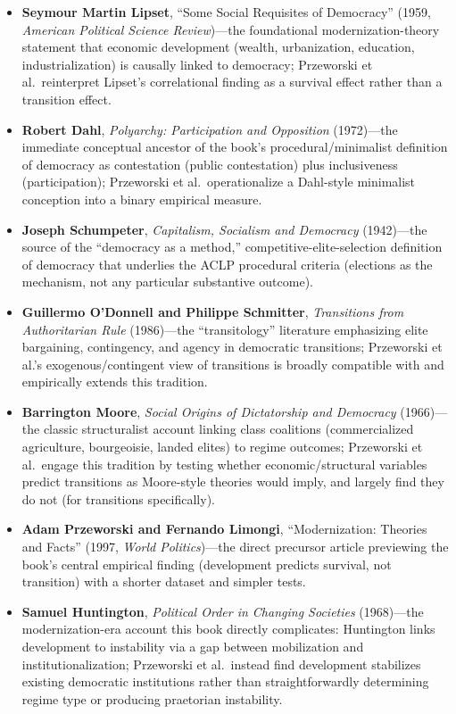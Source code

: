 \documentclass[12pt]{article}
\begin{document}
\begin{itemize}[leftmargin=*, itemsep=4pt]
    \item \textbf{Seymour Martin Lipset}, ``Some Social Requisites of Democracy'' (1959, \textit{American Political Science Review})---the foundational modernization-theory statement that economic development (wealth, urbanization, education, industrialization) is causally linked to democracy; Przeworski et al.\ reinterpret Lipset's correlational finding as a survival effect rather than a transition effect.
    \item \textbf{Robert Dahl}, \textit{Polyarchy: Participation and Opposition} (1972)---the immediate conceptual ancestor of the book's procedural/minimalist definition of democracy as contestation (public contestation) plus inclusiveness (participation); Przeworski et al.\ operationalize a Dahl-style minimalist conception into a binary empirical measure.
    \item \textbf{Joseph Schumpeter}, \textit{Capitalism, Socialism and Democracy} (1942)---the source of the ``democracy as a method,'' competitive-elite-selection definition of democracy that underlies the ACLP procedural criteria (elections as the mechanism, not any particular substantive outcome).
    \item \textbf{Guillermo O'Donnell and Philippe Schmitter}, \textit{Transitions from Authoritarian Rule} (1986)---the ``transitology'' literature emphasizing elite bargaining, contingency, and agency in democratic transitions; Przeworski et al.'s exogenous/contingent view of transitions is broadly compatible with and empirically extends this tradition.
    \item \textbf{Barrington Moore}, \textit{Social Origins of Dictatorship and Democracy} (1966)---the classic structuralist account linking class coalitions (commercialized agriculture, bourgeoisie, landed elites) to regime outcomes; Przeworski et al.\ engage this tradition by testing whether economic/structural variables predict transitions as Moore-style theories would imply, and largely find they do not (for transitions specifically).
    \item \textbf{Adam Przeworski and Fernando Limongi}, ``Modernization: Theories and Facts'' (1997, \textit{World Politics})---the direct precursor article previewing the book's central empirical finding (development predicts survival, not transition) with a shorter dataset and simpler tests.
    \item \textbf{Samuel Huntington}, \textit{Political Order in Changing Societies} (1968)---the modernization-era account this book directly complicates: Huntington links development to instability via a gap between mobilization and institutionalization; Przeworski et al.\ instead find development stabilizes existing democratic institutions rather than straightforwardly determining regime type or producing praetorian instability.

\end{itemize}
\end{document}
